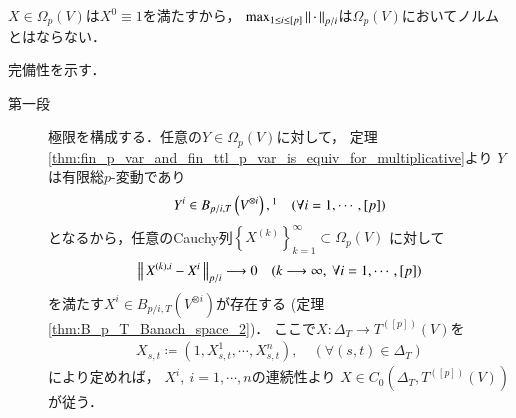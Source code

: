 	$X \in \Omega_p(V)$は$X^0 \equiv 1$を満たすから，
	$\operatorname*{max}_{1 \leq i \leq [p]} \left\|\, \cdot\, \right\|_{p/i}$は$\Omega_p(V)$においてノルムとはならない．
	
	\begin{prf}完備性を示す．
		\begin{description}
			\item[第一段] 極限を構成する．任意の$Y \in \Omega_p(V)$に対して，
			定理\ref{thm:fin_p_var_and_fin_ttl_p_var_is_equiv_for_multiplicative}より
			$Y$は有限総$p$-変動であり
			\begin{align}
				Y^i \in B_{p/i,T}\left( V^{\otimes i} \right),\footnotemark
				\quad (\forall i=1,\cdots,[p]) 
			\end{align}
			となるから，任意のCauchy列$\left\{ X^{(k)} \right\}_{k=1}^\infty \subset \Omega_p(V)$
			に対して
			\begin{align}
				\left\|\, X^{(k),i} - X^i\, \right\|_{p/i} \longrightarrow 0
				\quad (k \longrightarrow \infty,\ \forall i=1,\cdots,[p])
				\label{eq:thm_p_rough_path_complete_dist_2}
			\end{align}
			を満たす$X^i \in B_{p/i,T}\left( V^{\otimes i} \right)$が存在する
			(定理\ref{thm:B_p_T_Banach_space_2})．
			ここで$X:\Delta_T \longrightarrow T^{([p])}(V)$を
			\begin{align}
				X_{s,t} \coloneqq (1,X^1_{s,t},\cdots,X^n_{s,t}),
				\quad (\forall (s,t) \in \Delta_T)
			\end{align}
			により定めれば，
			$X^i,\ i=1,\cdots,n$の連続性より
			$X \in C_0 \left(\Delta_T,T^{([p])}(V) \right)$が従う．
		

\end{description}
\end{prf}
